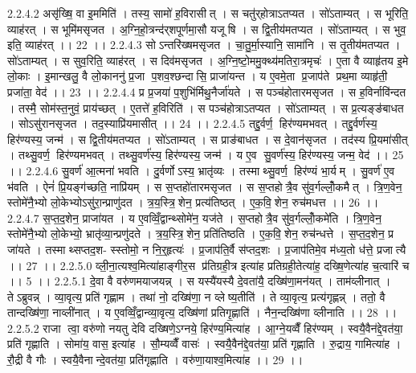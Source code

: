 2.2.4.2
असृ॑ख्षि॒ वा इ॒ममिति॑ । तस्य॒ सामो॑ ह॒विरासीत् । स चतु॑र्‌होत्राऽतप्यत । सो॑ऽताम्यत् । स भूरिति॒ व्याह॑रत् । स भूमि॑मसृजत । अ॒ग्नि॒हो॒त्रन्द॑र्‌शपूर्णमा॒सौ यजू॑षि । स द्वि॒तीय॑मतप्यत । सो॑ऽताम्यत् । स भुव॒ इति॒ व्याह॑रत् ।। 22 ।।
2.2.4.3
सोऽन्तरि॑ख्षमसृजत । चा॒तु॒र्मा॒स्यानि॒ सामा॑नि । स तृ॒तीय॑मतप्यत । सो॑ऽताम्यत् । स सुव॒रिति॒ व्याह॑रत् । स दिव॑मसृजत । अ॒ग्नि॒ष्टो॒ममु॒क्थ्य॑मतिरा॒त्रमृचः॑ । ए॒ता वै व्याहृ॑तय इ॒मे लो॒काः । इ॒मान्खलु॒ वै लो॒काननु॑ प्र॒जा प॒शव॒श्छन्दा॑सि॒ प्राजा॑यन्त । य ए॒वमे॒ता प्र॒जाप॑ते प्रथ॒मा व्याहृ॑ती॒ प्रजा॑ता॒ वेद॑ ।। 23 ।।
2.2.4.4
प्र प्र॒जया॑ प॒शुभि॑र्मिथु॒नैर्जा॑यते । स पञ्च॑होतारमसृजत । स ह॒विर्नावि॑न्दत । तस्मै॒ सोम॑स्त॒नुवं॒ प्राय॑च्छत् । ए॒तत्ते॑ ह॒विरिति॑ । स पञ्च॑होत्राऽतप्यत । सो॑ऽताम्यत् । स प्र॒त्यङ्ङ॑बाधत । सोऽसु॑रानसृजत । तद॒स्याप्रि॑यमासीत् ।। 24 ।।
2.2.4.5
तद्दु॒र्वर्ण॒॒ हिर॑ण्यमभवत् । तद्दु॒र्वर्ण॑स्य॒ हिर॑ण्यस्य॒ जन्म॑ । स द्वि॒तीय॑मतप्यत । सो॑ऽताम्यत् । स प्राङ॑बाधत । स दे॒वान॑सृजत । तद॑स्य प्रि॒यमा॑सीत् । तथ्सु॒वर्ण॒॒ हिर॑ण्यमभवत् । तथ्सु॒वर्ण॑स्य॒ हिर॑ण्यस्य॒ जन्म॑ । य ए॒व सु॒वर्ण॑स्य॒ हिर॑ण्यस्य॒ जन्म॒ वेद॑ ।। 25 ।।
2.2.4.6
सु॒वर्ण॑ आ॒त्मना॑ भवति । दु॒र्वर्णोऽस्य॒ भ्रातृ॑व्यः । तस्माथ्सु॒वर्ण॒॒ हिर॑ण्यं भा॒र्यम् । सु॒वर्ण॑ ए॒व भ॑वति । ऐनं॑ प्रि॒यङ्ग॑च्छति॒ नाप्रि॑यम् । स स॒प्तहो॑तारमसृजत । स स॒प्तहोत्रै॒व सु॑व॒र्गल्लोँ॒कमैत् । त्रि॒ण॒वेन॒ स्तोमे॑नै॒भ्यो लो॒केभ्योऽसु॑रा॒न्प्राणु॑दत । त्र॒य॒स्त्रि॒॒शेन॒ प्रत्य॑तिष्ठत् । ए॒क॒वि॒॒शेन॒ रुच॑मधत्त ।। 26 ।।
2.2.4.7
स॒प्त॒द॒शेन॒ प्राजा॑यत । य ए॒वव्विँ॒द्वान्थ्सोमे॑न॒ यज॑ते । स॒प्तहोत्रै॒व सु॑व॒र्गल्लोँ॒कमे॑ति । त्रि॒ण॒वेन॒ स्तोमे॑नै॒भ्यो लो॒केभ्यो॒ भ्रातृ॑व्या॒न्प्रणु॑दते । त्र॒य॒स्त्रि॒॒शेन॒ प्रति॑तिष्ठति । ए॒क॒वि॒॒शेन॒ रुच॑न्धत्ते । स॒प्त॒द॒शेन॒ प्र जा॑यते । तस्माथ्सप्तद॒श- स्स्तोमो॒ न नि॒र्॒हृत्यः॑ । प्र॒जाप॑ति॒र्वै स॑प्तद॒शः । प्र॒जाप॑तिमे॒व म॑ध्य॒तो ध॑त्ते॒ प्रजात्यै ।। 27 ।।
2.2.5.0
व्ली॒ना॒त्यश्व॒मित्या॑हाङ्गीर॒स प्र॑तिग्रही॒त्र इत्या॑ह प्रतिग्रही॒तेत्या॑ह॒ दख्षि॒णेत्या॑ह च॒त्वारि॑ च ।। 5 ।।
2.2.5.1
दे॒वा वै वरु॑णमयाजयन्न् । स यस्यै॑यस्यै दे॒वता॑यै॒ दख्षि॑णा॒मन॑यत् । ताम॑व्लीनात् । तेऽब्रुवन्न् । व्या॒वृत्य॒ प्रति॑ गृह्णाम । तथा॑ नो॒ दख्षि॑णा॒ न व्लेष्य॒तीति॑ । ते व्या॒वृत्य॒ प्रत्य॑गृह्णन्न् । ततो॒ वै तान्दख्षि॑णा॒ नाव्ली॑नात् । य ए॒वव्विँ॒द्वान्व्या॒वृत्य॒ दख्षि॑णां प्रतिगृ॒ह्णाति॑ । नैन॒न्दख्षि॑णा व्लीनाति ।। 28 ।।
2.2.5.2
राजा त्वा॒ वरु॑णो नयतु देवि दख्षिणे॒ऽग्नये॒ हिर॑ण्य॒मित्या॑ह । आ॒ग्ने॒यव्वैँ हिर॑ण्यम् । स्वयै॒वैन॑द्दे॒वत॑या॒ प्रति॑ गृह्णाति । सोमा॑य॒ वास॒ इत्या॑ह । सौ॒म्यव्वैँ वासः॑ । स्वयै॒वैन॑द्दे॒वत॑या॒ प्रति॑ गृह्णाति । रु॒द्राय॒ गामित्या॑ह । रौ॒द्री वै गौः । स्वयै॒वैनान्दे॒वत॑या॒ प्रति॑गृह्णाति । वरु॑णा॒याश्व॒मित्या॑ह ।। 29 ।।
